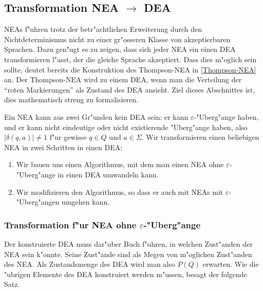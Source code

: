 \subsection{Transformation NEA $\rightarrow$ DEA\label{regulaer:nea-dea}}
NEAs f"uhren trotz der betr"achtlichen Erweiterung durch den
Nichtdeterminismus nicht zu einer gr"osseren Klasse von akzeptierbaren
Sprachen. Dazu gen"ugt es zu zeigen, dass sich jeder NEA ein einen DEA
transformieren l"asst, der die gleiche Sprache akzeptiert.
Dass dies m"oglich sein sollte, deutet bereits die Konstruktion
des Thompson-NEA in \ref{Thompson-NEA} an. Der Thompson-NEA
wird zu einem DEA, wenn man die Verteilung der ``roten Markierungen''
als Zustand des DEA ansieht. Ziel dieses Abschnittes ist, dies
mathematisch streng zu formalisieren.

Ein NEA kann aus zwei Gr"unden kein DEA sein:
er kann $\varepsilon$-"Uberg"ange haben, und er kann nicht eindeutige
oder nicht existierende "Uberg"ange haben, also $|\delta(q,a)|\ne 1$
f"ur gewisse $q\in Q$ und $a\in\Sigma$.  Wir transformieren einen 
beliebigen NEA in zwei Schritten in einen DEA:
\begin{enumerate}
\item Wir bauen uns einen Algorithmus, mit dem man einen NEA ohne
$\varepsilon$-"Uberg"ange in einen DEA umwandeln kann.
\item Wir modifizieren den Algorithmus, so dass er auch mit NEAs mit
$\varepsilon$-"Uberg"angen umgehen kann.
\end{enumerate}

\subsubsection{Transformation f"ur NEA ohne $\varepsilon$-"Uberg"ange}
Der konstruierte DEA muss dar"uber Buch f"uhren, in welchen Zust"anden
der NEA sein k"onnte. Seine Zust"ande sind als Megen von m"oglichen
Zust"anden des NEA. Als Zustandsmenge des DEA wird man also $P(Q)$ 
erwarten. Wie die "ubrigen Elemente des DEA konstruiert werden m"ussen,
besagt der folgende Satz.

